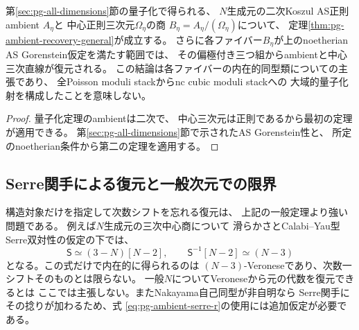 \begin{corollary}[一般次元の中心三次量子化への適用]
\label{cor:pg-ambient-recovery-quantization}
第\ref{sec:pg-all-dimensions}節の量子化で得られる、
$N$生成元の二次Koszul AS正則ambient $A_\eta$と
中心正則三次元$\Omega_\eta$の商
$B_\eta=A_\eta/(\Omega_\eta)$について、
定理\ref{thm:pg-ambient-recovery-general}が成立する。
さらに各ファイバー$B_\eta$が上のnoetherian
AS Gorenstein仮定を満たす範囲では、
その偏極付き三つ組からambientと中心三次直線が復元される。
この結論は各ファイバーの内在的同型類についての主張であり、
全Poisson moduli stackからnc cubic moduli stackへの
大域的量子化射を構成したことを意味しない。
\end{corollary}
\begin{proof}
量子化定理のambientは二次で、
中心三次元は正則であるから最初の定理が適用できる。
第\ref{sec:pg-all-dimensions}節で示されたAS Gorenstein性と、
所定のnoetherian条件から第二の定理を適用する。
\end{proof}

\subsection{Serre関手による復元と一般次元での限界}
\label{sec:pg-ambient-serre}
構造対象だけを指定して次数シフトを忘れる復元は、
上記の一般定理より強い問題である。
例えば$N$生成元の三次中心商について
滑らかさとCalabi--Yau型Serre双対性の仮定の下では、
\begin{equation}\label{eq:pg-ambient-serre-r}
 \mathsf S\simeq(3-N)[N-2],\qquad
 \mathsf S^{-1}[N-2]\simeq(N-3)
\end{equation}
となる。この式だけで内在的に得られるのは
$(N-3)$-Veroneseであり、次数一シフトそのものとは限らない。
一般$N$についてVeroneseから元の代数を復元できるとは
ここでは主張しない。またNakayama自己同型が非自明なら
Serre関手にその捻りが加わるため、式
\eqref{eq:pg-ambient-serre-r}の使用には追加仮定が必要である。

